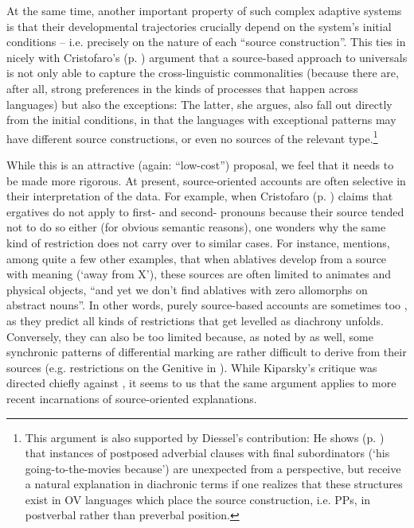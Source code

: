 \documentclass[output=paper]{langsci/langscibook}
\begin{document}
At the same time, another important property of such complex adaptive systems is that their developmental trajectories crucially depend on the system’s initial conditions – i.e. precisely on the nature of each “source construction”. This ties in nicely with Cristofaro’s (p. \pageref{p:cristofaro:commonalitiesexceptions}) argument that a source-based approach to universals is not only able to capture the cross-linguistic commonalities (because there are, after all, strong preferences in the kinds of  processes that happen across languages) but also the exceptions: The latter, she argues, also fall out directly from the initial conditions, in that the languages with exceptional patterns may have different source constructions, or even no sources of the relevant type.\footnote{This argument is also supported by Diessel’s contribution: He shows (p. \pageref{p:diessel:exception}) that instances of postposed adverbial clauses with final subordinators (‘his going-to-the-movies because’) are unexpected from a  perspective, but receive a natural explanation in diachronic terms if one realizes that these structures exist in OV languages which place the source construction, i.e.  PPs, in postverbal rather than preverbal position.}  

While this is an attractive (again: “low-cost”) proposal, we feel that it needs to be made more rigorous. At present, source-oriented accounts are often selective in their interpretation of the data. For example, when Cristofaro (p. \pageref{p:cristofaro:ergatives}) claims that ergatives do not apply to first- and second- pronouns because their  source tended not to do so either (for obvious semantic reasons), one wonders why the same kind of restriction does not carry over to similar cases. For instance, \citet[36]{Kiparsky2008} mentions, among quite a few other examples, that when ablatives develop from a source with  meaning (‘away from X’), these sources are often limited to animates and physical objects, “and yet we don't find ablatives with zero allomorphs on abstract nouns”. In other words, purely source-based accounts are sometimes too , as they predict all kinds of restrictions that get levelled as diachrony unfolds. Conversely, they can also be too limited because, as noted by \citet{Kiparsky2008} as well, some synchronic patterns of differential marking are rather difficult to derive from their sources (e.g.  restrictions on the Genitive in ). While Kiparsky’s critique was directed chiefly against \citet{Garrett1990}, it seems to us that the same argument applies to more recent incarnations of source-oriented explanations.
\end{document}
